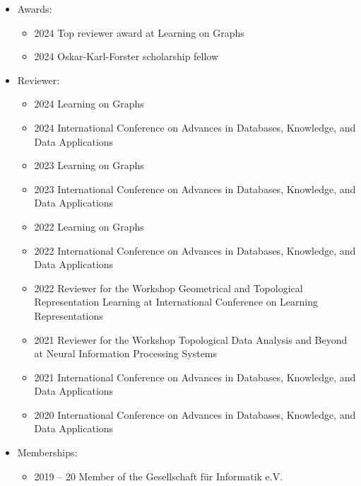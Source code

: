 \documentclass[a4paper, 11pt]{article}
\newcommand{\years}[1]{\marginnote{\scriptsize #1}}
\begin{document}
	\years{Service}
	\vspace{-10pt}
	\begin{itemize}[noitemsep, leftmargin=*]
		\item Awards:
			\begin{itemize}[noitemsep, leftmargin=*]
				\item 2024 Top reviewer award at Learning on Graphs

				\item 2024 Oskar-Karl-Forster scholarship fellow
			\end{itemize}

		\item Reviewer:
			\begin{itemize}[noitemsep, leftmargin=*]
				\item 2024 Learning on Graphs

				\item 2024 International Conference on Advances in Databases, Knowledge,
					and Data Applications

				\item 2023 Learning on Graphs

				\item 2023 International Conference on Advances in Databases, Knowledge,
					and Data Applications

				\item 2022 Learning on Graphs

				\item 2022 International Conference on Advances in Databases, Knowledge,
					and Data Applications

				\item 2022 Reviewer for the Workshop Geometrical and Topological Representation
					Learning at International Conference on Learning Representations

				\item 2021 Reviewer for the Workshop Topological Data Analysis and Beyond
					at Neural Information Processing Systems

				\item 2021 International Conference on Advances in Databases, Knowledge,
					and Data Applications

				\item 2020 International Conference on Advances in Databases, Knowledge,
					and Data Applications
			\end{itemize}

		\item Memberships:
			\begin{itemize}[noitemsep, leftmargin=*]
				\item 2019 -- 20 Member of the Gesellschaft für Informatik e.V.


\end{itemize}
\end{itemize}
\end{document}
